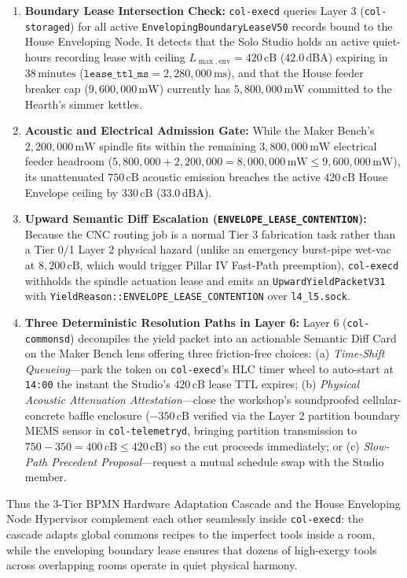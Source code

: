 \begin{enumerate}
    \item \textbf{Boundary Lease Intersection Check:} \texttt{col-execd} queries Layer 3 (\texttt{col-storaged}) for all active \texttt{EnvelopingBoundaryLeaseV50} records bound to the House Enveloping Node. It detects that the Solo Studio holds an active quiet-hours recording lease with ceiling $L_{\max,\mathrm{env}} = 420\,\mathrm{cB}$ ($42.0\,\mathrm{dBA}$) expiring in $38\,\mathrm{minutes}$ ($\texttt{lease\_ttl\_ms} = 2{,}280{,}000\,\mathrm{ms}$), and that the House feeder breaker cap ($9{,}600{,}000\,\mathrm{mW}$) currently has $5{,}800{,}000\,\mathrm{mW}$ committed to the Hearth's simmer kettles.
    \item \textbf{Acoustic and Electrical Admission Gate:} While the Maker Bench's $2{,}200{,}000\,\mathrm{mW}$ spindle fits within the remaining $3{,}800{,}000\,\mathrm{mW}$ electrical feeder headroom ($5{,}800{,}000 + 2{,}200{,}000 = 8{,}000{,}000\,\mathrm{mW} \le 9{,}600{,}000\,\mathrm{mW}$), its unattenuated $750\,\mathrm{cB}$ acoustic emission breaches the active $420\,\mathrm{cB}$ House Envelope ceiling by $330\,\mathrm{cB}$ ($33.0\,\mathrm{dBA}$).
    \item \textbf{Upward Semantic Diff Escalation (\texttt{ENVELOPE\_LEASE\_CONTENTION}):} Because the CNC routing job is a normal Tier 3 fabrication task rather than a Tier 0/1 Layer 2 physical hazard (unlike an emergency burst-pipe wet-vac at $8{,}200\,\mathrm{cB}$, which would trigger Pillar IV Fast-Path preemption), \texttt{col-execd} withholds the spindle actuation lease and emits an \texttt{UpwardYieldPacketV31} with \texttt{YieldReason::ENVELOPE\_LEASE\_CONTENTION} over \texttt{l4\_l5.sock}.
    \item \textbf{Three Deterministic Resolution Paths in Layer 6:} Layer 6 (\texttt{col-commonsd}) decompiles the yield packet into an actionable Semantic Diff Card on the Maker Bench lens offering three friction-free choices: (a) \emph{Time-Shift Queueing}---park the token on \texttt{col-execd}'s HLC timer wheel to auto-start at \texttt{14:00} the instant the Studio's $420\,\mathrm{cB}$ lease TTL expires; (b) \emph{Physical Acoustic Attenuation Attestation}---close the workshop's soundproofed cellular-concrete baffle enclosure ($-350\,\mathrm{cB}$ verified via the Layer 2 partition boundary MEMS sensor in \texttt{col-telemetryd}, bringing partition transmission to $750 - 350 = 400\,\mathrm{cB} \le 420\,\mathrm{cB}$) so the cut proceeds immediately; or (c) \emph{Slow-Path Precedent Proposal}---request a mutual schedule swap with the Studio member.
\end{enumerate}

Thus the 3-Tier BPMN Hardware Adaptation Cascade and the House Enveloping Node Hypervisor complement each other seamlessly inside \texttt{col-execd}: the cascade adapts global commons recipes to the imperfect tools inside a room, while the enveloping boundary lease ensures that dozens of high-exergy tools across overlapping rooms operate in quiet physical harmony.
